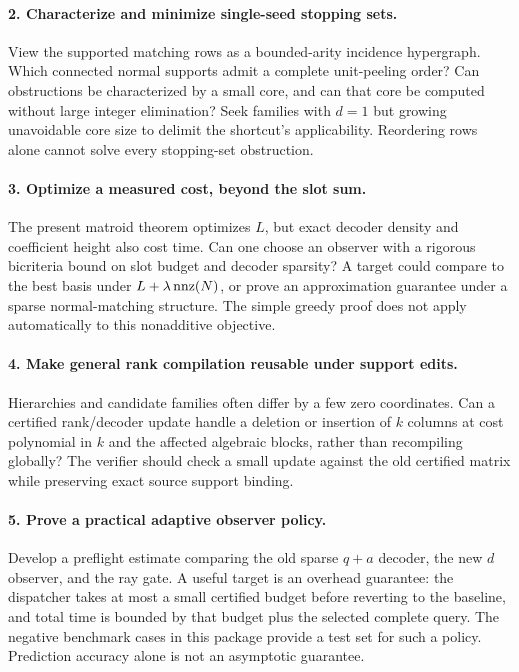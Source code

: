 \paragraph{2. Characterize and minimize single-seed stopping sets.}
View the supported matching rows as a bounded-arity incidence hypergraph.
Which connected normal supports admit a complete unit-peeling order?  Can
obstructions be characterized by a small core, and can that core be computed
without large integer elimination?  Seek families with $d=1$ but growing
unavoidable core size to delimit the shortcut's applicability.  Reordering
rows alone cannot solve every stopping-set obstruction.

\paragraph{3. Optimize a measured cost, beyond the slot sum.}
The present matroid theorem optimizes $L$, but exact decoder density and
coefficient height also cost time.  Can one choose an observer with a rigorous
bicriteria bound on slot budget and decoder sparsity?  A target could compare
to the best basis under $L+\lambda\operatorname{nnz}(N)$, or prove an approximation guarantee
under a sparse normal-matching structure.  The simple greedy proof does not
apply automatically to this nonadditive objective.

\paragraph{4. Make general rank compilation reusable under support edits.}
Hierarchies and candidate families often differ by a few zero coordinates.
Can a certified rank/decoder update handle a deletion or insertion of $k$
columns at cost polynomial in $k$ and the affected algebraic blocks, rather
than recompiling globally?  The verifier should check a small update against
the old certified matrix while preserving exact source support binding.

\paragraph{5. Prove a practical adaptive observer policy.}
Develop a preflight estimate comparing the old sparse $q+a$ decoder, the new
$d$ observer, and the ray gate.  A useful target is an overhead guarantee:
the dispatcher takes at most a small certified budget before reverting to the
baseline, and total time is bounded by that budget plus the selected complete
query.  The negative benchmark cases in this package provide a test set for
such a policy.  Prediction accuracy alone is not an asymptotic guarantee.

